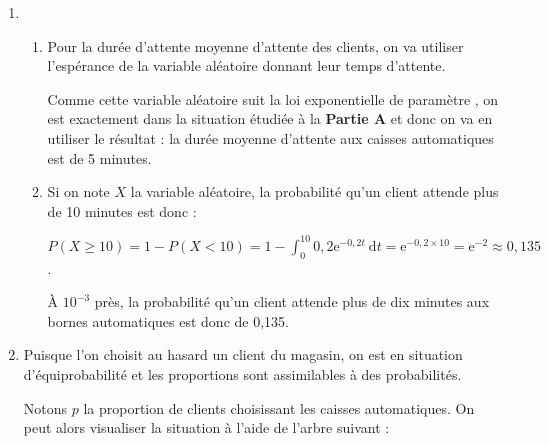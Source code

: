 \documentclass[10pt]{article}
\def\e{\text{e}}
\begin{document}
	\begin{enumerate}
		\item \begin{enumerate}
			\item Pour la durée d'attente moyenne d'attente des clients, on va utiliser l'espérance de la variable aléatoire donnant leur temps d'attente.  
			
			Comme cette variable aléatoire suit la loi exponentielle de paramètre , on est exactement dans la situation étudiée à la \textbf{Partie A} et donc on va en utiliser le résultat : la durée moyenne d'attente aux caisses automatiques est de 5 minutes.
			
			\item Si on note $X$ la variable aléatoire, la probabilité qu'un client attende plus de 10 minutes est donc :
			
			$\displaystyle P(X \geqslant 10) = 1 - P(X < 10) = 1 - \int_{0}^{10} 0,2\e^{-0,2t}~\text{d}t = \e^{-0,2 \times 10} = \e^{-2} \approx 0,135$.
			
			À $10^{-3}$ près, la probabilité qu'un client attende plus de dix minutes aux bornes automatiques est donc de 0,135.
		\end{enumerate}
	\item Puisque l'on choisit au hasard un client du magasin, on est en situation d'équiprobabilité et les proportions sont assimilables à des probabilités.
	
	Notons $p$ la proportion de clients choisissant les caisses automatiques. On peut alors visualiser la situation à l'aide de l'arbre suivant :
	

\end{enumerate}
\end{document}
